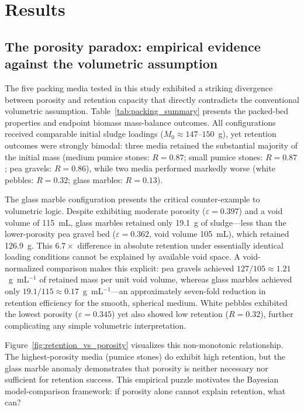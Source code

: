 \documentclass[12pt,a4paper]{article}
\begin{document}
\section{Results}

\subsection{The porosity paradox: empirical evidence against the volumetric assumption}

The five packing media tested in this study exhibited a striking divergence between porosity and retention capacity that directly contradicts the conventional volumetric assumption. Table~\ref{tab:packing_summary} presents the packed-bed properties and endpoint biomass mass-balance outcomes. All configurations received comparable initial sludge loadings ($M_0 \approx 147$--$150$~g), yet retention outcomes were strongly bimodal: three media retained the substantial majority of the initial mass (medium pumice stones: $R=0.87$; small pumice stones: $R=0.87$; pea gravels: $R=0.86$), while two media performed markedly worse (white pebbles: $R=0.32$; glass marbles: $R=0.13$).

The glass marble configuration presents the critical counter-example to volumetric logic. Despite exhibiting moderate porosity ($\varepsilon=0.397$) and a void volume of 115~mL, glass marbles retained only 19.1~g of sludge---less than the lower-porosity pea gravel bed ($\varepsilon=0.362$, void volume 105~mL), which retained 126.9~g. This $6.7\times$ difference in absolute retention under essentially identical loading conditions cannot be explained by available void space. A void-normalized comparison makes this explicit: pea gravels achieved $127/105 \approx 1.21$~g~mL$^{-1}$ of retained mass per unit void volume, whereas glass marbles achieved only $19.1/115 \approx 0.17$~g~mL$^{-1}$---an approximately seven-fold reduction in retention efficiency for the smooth, spherical medium. White pebbles exhibited the lowest porosity ($\varepsilon=0.345$) yet also showed low retention ($R=0.32$), further complicating any simple volumetric interpretation.

Figure~\ref{fig:retention_vs_porosity} visualizes this non-monotonic relationship. The highest-porosity media (pumice stones) do exhibit high retention, but the glass marble anomaly demonstrates that porosity is neither necessary nor sufficient for retention success. This empirical puzzle motivates the Bayesian model-comparison framework: if porosity alone cannot explain retention, what can?
\end{document}
